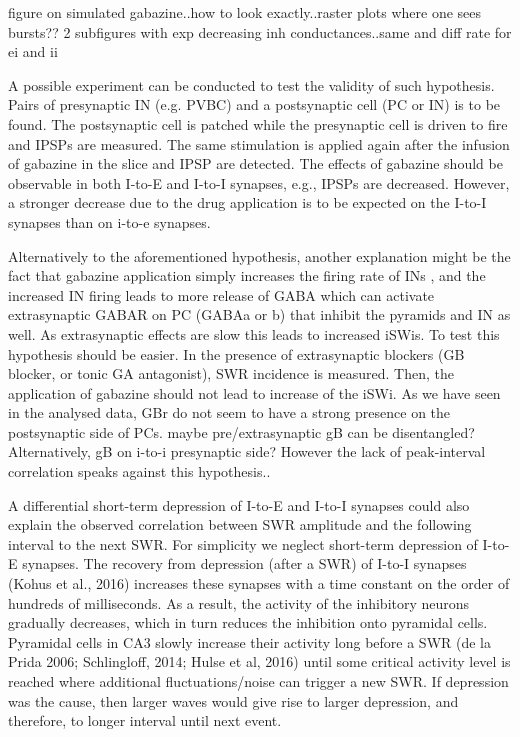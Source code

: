     figure on simulated gabazine..how to look exactly..raster plots where one sees bursts?? 2 subfigures with exp decreasing inh conductances..same and diff rate for ei and ii

    A possible experiment can be conducted to test the validity of such
    hypothesis.  Pairs of presynaptic IN (e.g. PVBC) and a postsynaptic cell
    (PC or IN) is to be found.  The postsynaptic cell is patched while the
    presynaptic cell is driven to fire and IPSPs are measured.  The same
    stimulation is applied again after the infusion of gabazine in the slice
    and IPSP are detected.  The effects of gabazine should be observable in
    both I-to-E and I-to-I synapses, e.g., IPSPs are decreased.  However, a
    stronger decrease due to the drug application is to be expected on the
    I-to-I synapses than on i-to-e synapses.

    Alternatively to the aforementioned hypothesis, another explanation might
    be the fact that gabazine application simply increases the firing rate of
    INs \citep{Schlingloff2014}, and the increased IN firing leads to more
    release of GABA which can activate extrasynaptic GABAR on PC (GABAa or b)
    that inhibit the pyramids and IN as well. As extrasynaptic effects are slow
    this leads to increased iSWis. To test this hypothesis should be easier. In
    the presence of extrasynaptic blockers (GB blocker, or tonic GA
    antagonist), SWR incidence is measured. Then, the application of gabazine
    should not lead to increase of the iSWi.  As we have seen in the analysed
    data, GBr do not seem to have a strong presence on the postsynaptic side of
    PCs. maybe pre/extrasynaptic gB can be disentangled? Alternatively, gB on
    i-to-i presynaptic side?  However the lack of peak-interval correlation
    speaks against this hypothesis..

    A differential short-term depression of I-to-E and I-to-I synapses could
    also explain the observed correlation between SWR amplitude and the
    following interval to the next SWR. For simplicity we neglect short-term
    depression of I-to-E synapses. The recovery from depression (after a SWR)
    of I-to-I synapses (Kohus et al., 2016) increases these synapses with a
    time constant on the order of hundreds of milliseconds. As a result, the
    activity of the inhibitory neurons gradually decreases, which in turn
    reduces the inhibition onto pyramidal cells. Pyramidal cells in CA3 slowly
    increase their activity long before a SWR (de la Prida 2006; Schlingloff,
    2014; Hulse et al, 2016) until some critical activity level is reached
    where additional fluctuations/noise can trigger a new SWR.  If depression
    was the cause, then larger waves would give rise to larger depression, and
    therefore, to longer interval until next event.

